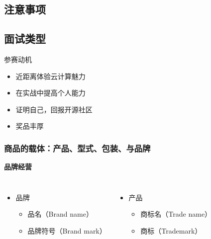 \documentclass[12pt]{beamer}
\begin{document}
\begin{CJK}{UTF8}{gkai}
\section{注意事项}
\subsection{面试类型}
\begin{frame}{参赛动机}{}
  \begin{itemize}
	\item{近距离体验云计算魅力}
  \end{itemize}
  \begin{itemize}
	\item{ 在实战中提高个人能力}
  \end{itemize}
\begin{itemize}
	\item{证明自己，回报开源社区}
  \end{itemize}
\begin{itemize}
	\item{奖品丰厚}
  \end{itemize}

\end{frame}
\begin{frame}
\frametitle{商品的载体：产品、型式、包装、与品牌}
\bfseries\large\color{violet}品牌经营
\mdseries
\begin{columns}
\column{6cm}
\linespread{1.2}
\begin{itemize}
\item  品牌
    \begin{itemize}
    \item  品名（Brand name）
    \item  品牌符号（Brand mark）
    \end{itemize}
\end{itemize}
\begin{itemize}
\item  产品
    \begin{itemize}
    \item  商标名（Trade name）
    \item  商标（Trademark）
    \end{itemize}
\end{itemize}
\end{columns}
\end{frame}

\end{CJK}
\end{document}
